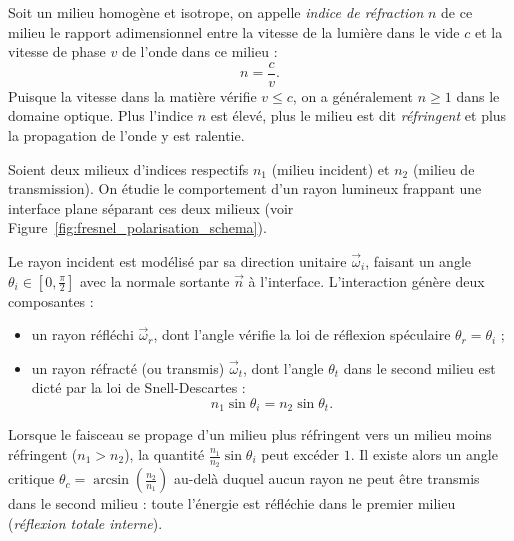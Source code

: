 \begin{definition}
    Soit un milieu homogène et isotrope, on appelle \emph{indice de réfraction} $n$ de ce milieu le rapport adimensionnel entre la vitesse de la lumière dans le vide $c$ et la vitesse de phase $v$ de l'onde dans ce milieu :
    \begin{equation}
        n = \frac{c}{v}.
    \end{equation}
    Puisque la vitesse dans la matière vérifie $v \leqslant c$, on a généralement $n \geqslant 1$ dans le domaine optique. Plus l'indice $n$ est élevé, plus le milieu est dit \emph{réfringent} et plus la propagation de l'onde y est ralentie.
\end{definition}

Soient deux milieux d'indices respectifs $n_1$ (milieu incident) et $n_2$ (milieu de transmission). On étudie le comportement d'un rayon lumineux frappant une interface plane séparant ces deux milieux (voir Figure~\ref{fig:fresnel_polarisation_schema}).



Le rayon incident est modélisé par sa direction unitaire $\vec{\omega}_i$, faisant un angle $\theta_i \in [0, \frac{\pi}{2}]$ avec la normale sortante $\vec{n}$ à l'interface. L'interaction génère deux composantes :
\begin{itemize}
    \item un rayon réfléchi $\vec{\omega}_r$, dont l'angle vérifie la loi de réflexion spéculaire $\theta_r = \theta_i$ ;
    \item un rayon réfracté (ou transmis) $\vec{\omega}_t$, dont l'angle $\theta_t$ dans le second milieu est dicté par la loi de Snell-Descartes :
    \begin{equation}
        n_1 \sin\theta_i = n_2 \sin\theta_t.
    \end{equation}
\end{itemize}

\begin{remark}
    Lorsque le faisceau se propage d'un milieu plus réfringent vers un milieu moins réfringent ($n_1 > n_2$), la quantité $\frac{n_1}{n_2}\sin\theta_i$ peut excéder $1$. Il existe alors un angle critique $\theta_c = \arcsin\left(\frac{n_2}{n_1}\right)$ au-delà duquel aucun rayon ne peut être transmis dans le second milieu : toute l'énergie est réfléchie dans le premier milieu (\emph{réflexion totale interne}).
\end{remark}

